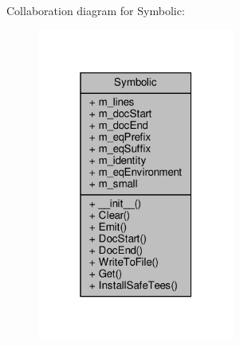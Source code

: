 Collaboration diagram for Symbolic\+:\nopagebreak
\begin{figure}[H]
\begin{center}
\leavevmode
\includegraphics[width=184pt]{classSignalIntegrity_1_1SystemDescriptions_1_1Symbolic_1_1Symbolic__coll__graph}
\end{center}
\end{figure}
